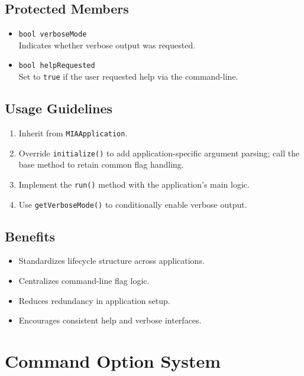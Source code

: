 \subsection*{Protected Members}
\begin{itemize}
	\item \texttt{bool verboseMode} \\
	Indicates whether verbose output was requested.
	\item \texttt{bool helpRequested} \\
	Set to \texttt{true} if the user requested help via the command-line.
\end{itemize}

\subsection*{Usage Guidelines}
\begin{enumerate}
	\item Inherit from \texttt{MIAApplication}.
	\item Override \texttt{initialize()} to add application-specific argument parsing; call the base method to retain common flag handling.
	\item Implement the \texttt{run()} method with the application's main logic.
	\item Use \texttt{getVerboseMode()} to conditionally enable verbose output.
\end{enumerate}

\subsection*{Benefits}
\begin{itemize}
	\item Standardizes lifecycle structure across applications.
	\item Centralizes command-line flag logic.
	\item Reduces redundancy in application setup.
	\item Encourages consistent help and verbose interfaces.
\end{itemize}










\section{Command Option System}

